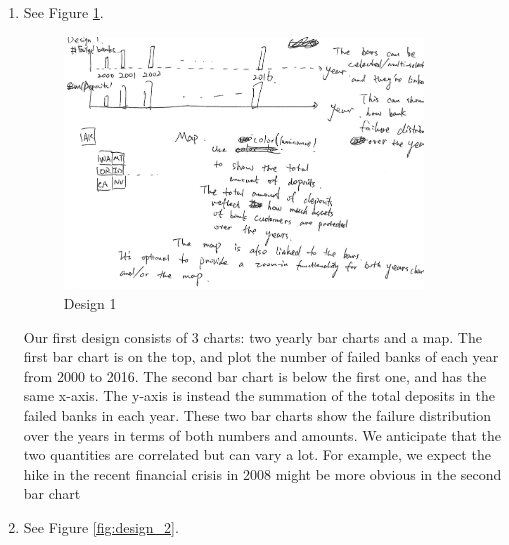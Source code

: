 \documentclass[11pt]{article}
\begin{document}
\begin{enumerate}
    \item See Figure \ref{fig:design_1}.

        \begin{figure}[!h]
            \centering
            \includegraphics[width=0.9\textwidth]{fig/design_1}
            \caption{Design 1}
            \label{fig:design_1}
        \end{figure}

        Our first design consists of 3 charts: two yearly bar charts and a
        map.  The first bar chart is on the top, and plot the number of failed
        banks of each year from 2000 to 2016. The second bar chart is below
        the first one, and has the same x-axis. The y-axis is instead the
        summation of the total deposits in the failed banks in each year.
        These two bar charts show the failure distribution over the years in
        terms of both numbers and amounts. We anticipate that the two
        quantities are correlated but can vary a lot. For example, we expect
        the hike in the recent financial crisis in 2008 might be more
        obvious in the second bar chart 


    \item See Figure \ref{fig:design_2}.


\end{enumerate}
\end{document}

